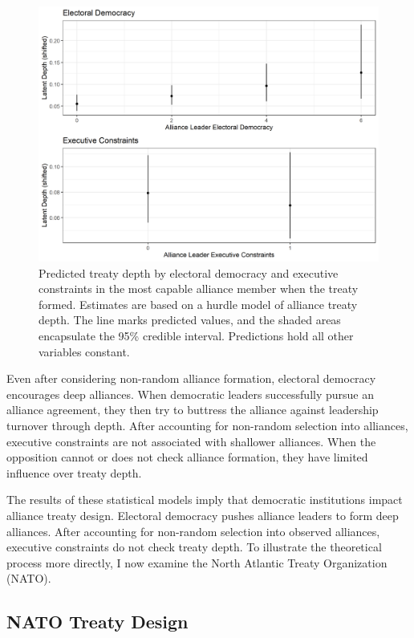 \documentclass[12pt]{article}
\begin{document}
\begin{figure}
\includegraphics[width=.95\textwidth]{../figures/results-hurdle.png}  
\caption{Predicted treaty depth by electoral democracy and executive constraints in the most capable alliance member when the treaty formed. Estimates are based on a hurdle model of alliance treaty depth. The line marks predicted values, and the shaded areas encapsulate the 95\% credible interval. Predictions hold all other variables constant.}
\label{fig:results-hurdle}
\end{figure}


Even after considering non-random alliance formation, electoral democracy encourages deep alliances. 
When democratic leaders successfully pursue an alliance agreement, they then try to buttress the alliance against leadership turnover through depth. 
After accounting for non-random selection into alliances, executive constraints are not associated with shallower alliances.
When the opposition cannot or does not check alliance formation, they have limited influence over treaty depth. 


The results of these statistical models imply that democratic institutions impact alliance treaty design. 
Electoral democracy pushes alliance leaders to form deep alliances. 
After accounting for non-random selection into observed alliances, executive constraints do not check treaty depth. 
To illustrate the theoretical process more directly, I now examine the North Atlantic Treaty Organization (NATO).



\subsection{NATO Treaty Design}
\end{document}
